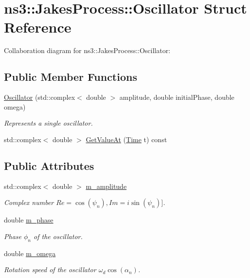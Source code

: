 \hypertarget{structns3_1_1JakesProcess_1_1Oscillator}{}\section{ns3\+:\+:Jakes\+Process\+:\+:Oscillator Struct Reference}
\label{structns3_1_1JakesProcess_1_1Oscillator}


Collaboration diagram for ns3\+:\+:Jakes\+Process\+:\+:Oscillator\+:
\subsection*{Public Member Functions}
\begin{DoxyCompactItemize}
\item 
\hyperlink{structns3_1_1JakesProcess_1_1Oscillator_a6d83dd0f29fc9b246e7198c877b89c99}{Oscillator} (std\+::complex$<$ double $>$ amplitude, double initial\+Phase, double omega)
\begin{DoxyCompactList}\small\item\em Represents a single oscillator. \end{DoxyCompactList}\item 
std\+::complex$<$ double $>$ \hyperlink{structns3_1_1JakesProcess_1_1Oscillator_a81eeae3a00d71f351d2a1750c149def5}{Get\+Value\+At} (\hyperlink{classns3_1_1Time}{Time} t) const 
\end{DoxyCompactItemize}
\subsection*{Public Attributes}
\begin{DoxyCompactItemize}
\item 
std\+::complex$<$ double $>$ \hyperlink{structns3_1_1JakesProcess_1_1Oscillator_ab69b71d8d1cfa433ffaaeb40472ce7ff}{m\+\_\+amplitude}
\begin{DoxyCompactList}\small\item\em Complex number $Re=\cos(\psi_n), Im = i\sin(\psi_n)]$. \end{DoxyCompactList}\item 
double \hyperlink{structns3_1_1JakesProcess_1_1Oscillator_a14994e4e5a14734bac9b6cd6d8cd9a04}{m\+\_\+phase}
\begin{DoxyCompactList}\small\item\em Phase $\phi_n$ of the oscillator. \end{DoxyCompactList}\item 
double \hyperlink{structns3_1_1JakesProcess_1_1Oscillator_aa415d476ec92702bcf026edb708e267d}{m\+\_\+omega}
\begin{DoxyCompactList}\small\item\em Rotation speed of the oscillator $\omega_d \cos(\alpha_n)$. \end{DoxyCompactList}\end{DoxyCompactItemize}


